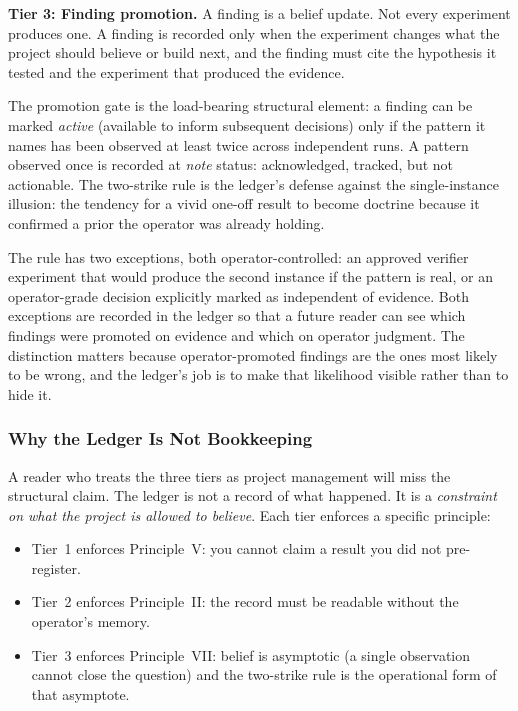 \documentclass[11pt]{article}
\begin{document}
\textbf{Tier 3: Finding promotion.} A finding is a belief update. Not every experiment produces one. A finding is recorded only when the experiment changes what the project should believe or build next, and the finding must cite the hypothesis it tested and the experiment that produced the evidence.

The promotion gate is the load-bearing structural element: a finding can be marked \emph{active} (available to inform subsequent decisions) only if the pattern it names has been observed at least twice across independent runs. A pattern observed once is recorded at \emph{note} status: acknowledged, tracked, but not actionable. The two-strike rule is the ledger's defense against the single-instance illusion: the tendency for a vivid one-off result to become doctrine because it confirmed a prior the operator was already holding.

The rule has two exceptions, both operator-controlled: an approved verifier experiment that would produce the second instance if the pattern is real, or an operator-grade decision explicitly marked as independent of evidence. Both exceptions are recorded in the ledger so that a future reader can see which findings were promoted on evidence and which on operator judgment. The distinction matters because operator-promoted findings are the ones most likely to be wrong, and the ledger's job is to make that likelihood visible rather than to hide it.

\subsubsection*{Why the Ledger Is Not Bookkeeping}

A reader who treats the three tiers as project management will miss the structural claim. The ledger is not a record of what happened. It is a \emph{constraint on what the project is allowed to believe}. Each tier enforces a specific principle:

\begin{itemize}
\item Tier~1 enforces Principle~V: you cannot claim a result you did not pre-register.
\item Tier~2 enforces Principle~II: the record must be readable without the operator's memory.
\item Tier~3 enforces Principle~VII: belief is asymptotic (a single observation cannot close the question) and the two-strike rule is the operational form of that asymptote.
\end{itemize}
\end{document}
